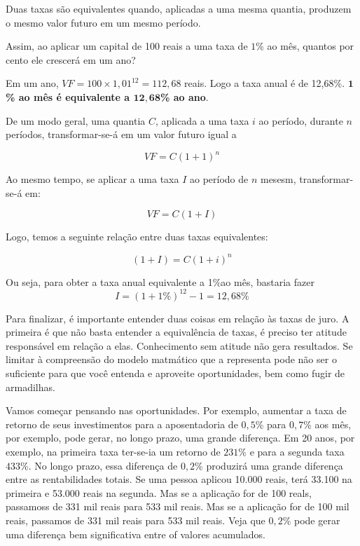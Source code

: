 
Duas taxas são equivalentes quando, aplicadas a uma mesma quantia, produzem o mesmo valor futuro em um mesmo período.

Assim, ao aplicar um capital de 100 reais a uma taxa de $1$\% ao mês, quantos por cento ele crescerá em um ano?

Em um ano, $VF = 100\times 1{,}01^{12} = 112{,}68$ reais. Logo a taxa anual é de 12,68\%. \textbf{$\bm{1}$\% ao mês é equivalente a $\bm{12,68}$\% ao ano}.

De um modo geral, uma quantia $C$, aplicada a uma taxa $i$ ao período, durante $n$ períodos, transformar-se-á em um valor futuro igual a 

$$VF=C(1+1)^n$$

Ao mesmo tempo, se aplicar a uma taxa $I$ ao período de $n$ mesesm, transformar-se-á em:

$$VF=C(1+I)$$

Logo, temos a seguinte relação entre duas taxas equivalentes:

$$(1+I)=C(1+i)^n$$

Ou seja, para obter a taxa anual equivalente a 1\%ao mês, bastaria fazer
$$I=(1+1\%)^{12}-1=12{,}68\%$$

Para finalizar, é importante entender duas coisas em relação às taxas de juro. A primeira é que não basta entender a equivalência de taxas, é preciso ter atitude responsável em relação a elas. Conhecimento sem atitude não gera resultados. Se limitar à compreensão do modelo matmático que a representa pode não ser o suficiente para que você entenda e aproveite oportunidades, bem como fugir de armadilhas.

Vamos começar pensando nas oportunidades. Por exemplo, aumentar a taxa de retorno de seus investimentos para a aposentadoria de $0{,}5$\% para $0{,}7$\% aos mês, por exemplo, pode gerar, no longo prazo, uma grande diferença. Em 20 anos, por exemplo, na primeira taxa ter-se-ia um retorno de $231$\% e para a segunda taxa $433$\%. No longo prazo, essa diferença de $0{,}2$\% produzirá uma grande diferença entre as rentabilidades totais. Se uma pessoa aplicou 10.000 reais, terá 33.100 na primeira e 53.000 reais na segunda. Mas se a aplicação for de 100 reals, passamoss de 331 mil reais para 533 mil reais. Mas se a aplicação for de 100 mil reais, passamos de 331 mil reais para 533 mil reais. Veja que $0{,}2$\% pode gerar uma diferença bem significativa entre of valores acumulados.

